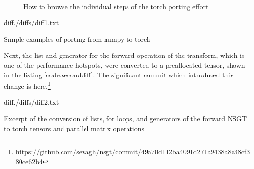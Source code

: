 \documentclass[report.tex]{subfiles}
\begin{document}
\begin{figure}[!ht]
	\centering
	\\
	\caption{How to browse the individual steps of the torch porting effort}
	\label{fig:ghcommitbrowser}
\end{figure}

\begin{listing}[ht]
  \centering
\begin{inputminted}[linenos,breaklines,frame=single,fontsize=\scriptsize]{diff}{./diffs/diff1.txt}
\end{inputminted}
  \caption{Simple examples of porting from numpy to torch}
  \label{code:firstdiff}
\end{listing}

Next, the list and generator for the forward operation of the transform, which is one of the performance hotspots, were converted to a preallocated tensor, shown in the listing \ref{code:seconddiff}. The significant commit which introduced this change is here.\footnote{\url{https://github.com/sevagh/nsgt/commit/49a70d112ba4091d271a9438a8c38cf380ce62b4}}

\begin{listing}[ht]
  \centering
\begin{inputminted}[linenos,breaklines,frame=single,fontsize=\scriptsize]{diff}{./diffs/diff2.txt}
\end{inputminted}
  \caption{Excerpt of the conversion of lists, for loops, and generators of the forward NSGT to torch tensors and parallel matrix operations}
  \label{code:seconddiff}
\end{listing}
\end{document}
